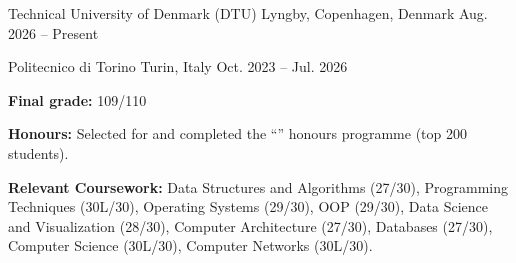 
\begin{cventries}

    {Technical University of Denmark (DTU)}
    {Lyngby, Copenhagen, Denmark}
    {Aug. 2026 -- Present}{}

    {Politecnico di Torino}
    {Turin, Italy}
    {Oct. 2023 -- Jul. 2026}
    {
      \begin{cvitems}
        \item{\textbf{Final grade:} 109/110}
        \item{\textbf{Honours:} Selected for and completed the ``'' honours programme (top 200 students).}
        \item{\textbf{Relevant Coursework:} Data Structures and Algorithms (27/30), Programming Techniques (30L/30), Operating Systems (29/30), OOP (29/30), Data Science and Visualization (28/30), Computer Architecture (27/30), Databases (27/30), Computer Science (30L/30), Computer Networks (30L/30).}
      \end{cvitems}
    }

\end{cventries}
